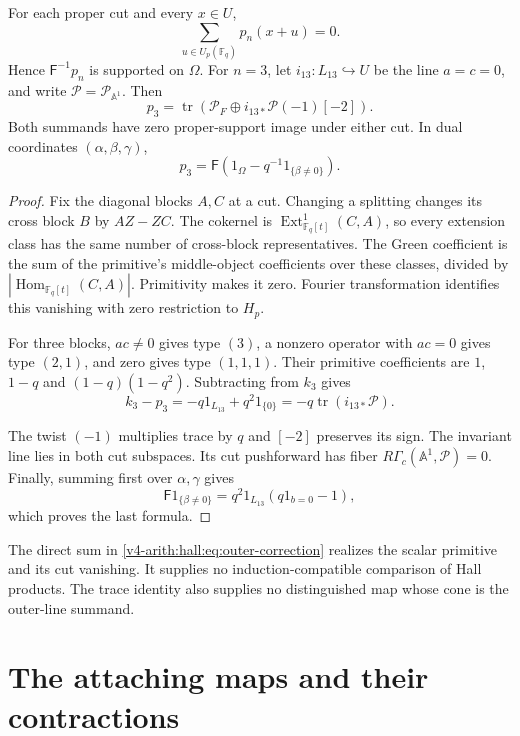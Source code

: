 \begin{proposition}\label{v4-arith:hall:prop:primitive-trace}
For each proper cut and every $x\in U$,
\[
 \sum_{u\in U_p(\mathbb F_q)}p_n(x+u)=0.
\]
Hence $\mathsf F^{-1}p_n$ is supported on $\Omega$.
For $n=3$, let $i_{13}:L_{13}\hookrightarrow U$ be the line
$a=c=0$, and write $\mathcal P=\mathcal P_{\mathbb A^1}$.
Then
\begin{equation}\label{v4-arith:hall:eq:outer-correction}
 p_3=\operatorname{tr}
       (\mathcal P_F\oplus i_{13*}\mathcal P(-1)[-2]).
\end{equation}
Both summands have zero proper-support image under either cut.
In dual coordinates $(\alpha,\beta,\gamma)$,
\[
 p_3=\mathsf F(1_\Omega-q^{-1}1_{\{\beta\ne0\}}).
\]
\end{proposition}
\begin{proof}
Fix the diagonal blocks $A,C$ at a cut. Changing a splitting
changes its cross block $B$ by $AZ-ZC$.
The cokernel is $\operatorname{Ext}^1_{\mathbb F_q[t]}(C,A)$,
so every extension class has the same number of cross-block
representatives. The Green coefficient is the sum of the primitive's
middle-object coefficients over these classes, divided by
$|\operatorname{Hom}_{\mathbb F_q[t]}(C,A)|$.
Primitivity makes it zero. Fourier transformation identifies this
vanishing with zero restriction to $H_p$.

For three blocks, $ac\ne0$ gives type $(3)$, a nonzero operator
with $ac=0$ gives type $(2,1)$, and zero gives type $(1,1,1)$.
Their primitive coefficients are $1$, $1-q$ and $(1-q)(1-q^2)$.
Subtracting from $k_3$ gives
\[
 k_3-p_3=-q1_{L_{13}}+q^2 1_{\{0\}}
         =-q\operatorname{tr}(i_{13*}\mathcal P).
\]

The twist $(-1)$ multiplies trace by $q$ and $[-2]$ preserves
its sign. The invariant line lies in both cut subspaces.
Its cut pushforward has fiber $R\Gamma_c(\mathbb A^1,\mathcal P)=0$.
Finally, summing first over $\alpha,\gamma$ gives
\[
 \mathsf F1_{\{\beta\ne0\}}
 =q^2 1_{L_{13}}(q1_{b=0}-1),
\]
which proves the last formula.
\end{proof}

The direct sum in \eqref{v4-arith:hall:eq:outer-correction} realizes
the scalar primitive and its cut vanishing. It supplies no
induction-compatible comparison of Hall products.
The trace identity also supplies no distinguished map whose cone
is the outer-line summand.

\section{The attaching maps and their contractions}
\label{v4-arith:hall:sec:gysin-cube}

